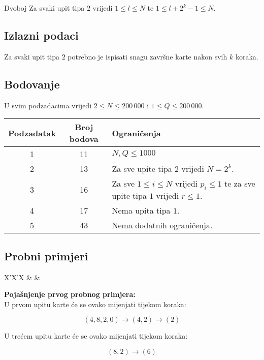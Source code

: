 \begin{statement}[
  problempoints=100,
  timelimit=2 sekunde,
  memorylimit=1024 MiB,
]{Dvoboj}
Za svaki upit tipa $2$ vrijedi $1 \leq l \leq N$ te $1 \leq l + 2^k - 1 \leq N$.

\subsection*{Izlazni podaci}

Za svaki upit tipa $2$ potrebno je ispisati snagu završne karte nakon svih $k$ koraka.

\subsection*{Bodovanje}

U svim podzadacima vrijedi $2 \leq N \leq 200\,000$ i $1 \leq Q \leq 200\,000$.

{\renewcommand{\arraystretch}{1.4}
  \setlength{\tabcolsep}{6pt}
  \begin{tabular}{ccl}
   Podzadatak & Broj bodova & Ograničenja \\ \midrule
    1 & 11 & $N, Q \leq 1000$ \\
    2 & 13 & Za sve upite tipa $2$ vrijedi $N = 2^k$. \\
    3 & 16 & Za sve $1 \leq i \leq N$ vrijedi $p_i \leq 1$ te za sve upite tipa $1$ vrijedi $r \leq 1$.\\
    4 & 17 & Nema upita tipa $1$. \\
    5 & 43 & Nema dodatnih ograničenja. \\
\end{tabular}}

\subsection*{Probni primjeri}
\begin{tabularx}{\textwidth}{X'X'X}
 &
 &
\end{tabularx}

\textbf{Pojašnjenje prvog probnog primjera:}\\

U prvom upitu karte će se ovako mijenjati tijekom koraka:

\[ (4, 8, 2, 0) \rightarrow (4, 2) \rightarrow (2) \]

U trećem upitu karte će se ovako mijenjati tijekom koraka:

\[ (8, 2) \rightarrow (6) \]
  
\end{statement}


